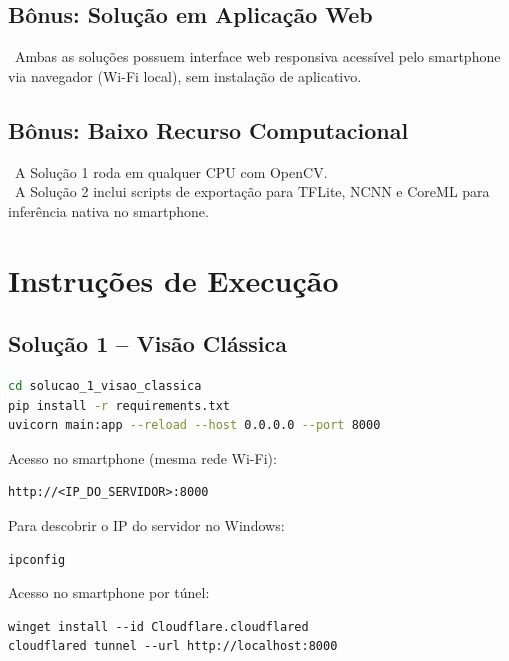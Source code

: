 \documentclass[12pt,a4paper]{article}
\begin{document}
\subsection{B\^onus: Solu\c{c}\~ao em Aplica\c{c}\~ao Web}

\checkmark\ Ambas as solu\c{c}\~oes possuem interface web responsiva acess\'ivel
pelo smartphone via navegador (Wi-Fi local), sem instala\c{c}\~ao de aplicativo.

\subsection{B\^onus: Baixo Recurso Computacional}

\checkmark\ A Solu\c{c}\~ao 1 roda em qualquer CPU com OpenCV. \\
\checkmark\ A Solu\c{c}\~ao 2 inclui scripts de exporta\c{c}\~ao para TFLite, NCNN e
CoreML para infer\^encia nativa no smartphone.

\section{Instru\c{c}\~oes de Execu\c{c}\~ao}

\subsection{Solu\c{c}\~ao 1 -- Vis\~ao Cl\'assica}

\begin{lstlisting}[language=bash, caption={Iniciar a Solu\c{c}\~ao 1}]
cd solucao_1_visao_classica
pip install -r requirements.txt
uvicorn main:app --reload --host 0.0.0.0 --port 8000
\end{lstlisting}

Acesso no smartphone (mesma rede Wi-Fi):
\begin{verbatim}
http://<IP_DO_SERVIDOR>:8000
\end{verbatim}


Para descobrir o IP do servidor no Windows:

\begin{lstlisting}[caption={Verificar IP local do servidor}]
ipconfig
\end{lstlisting}

Acesso no smartphone por túnel:

\begin{lstlisting}[caption={Criar túnel público para acesso via smartphone}]
winget install --id Cloudflare.cloudflared
cloudflared tunnel --url http://localhost:8000
\end{lstlisting}
\end{document}
